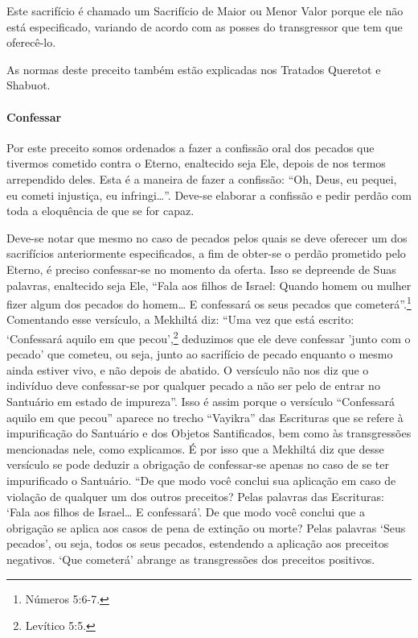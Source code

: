 Este sacrifício é chamado um Sacrifício de Maior ou Menor Valor porque
ele não está especificado, variando de acordo com as posses do
transgressor que tem que oferecê-lo.

As normas deste preceito também estão explicadas nos Tratados Queretot
e Shabuot.

\paragraph{Confessar}

Por este preceito somos ordenados a fazer a confissão oral dos pecados
que tivermos cometido contra o Eterno, enaltecido seja Ele, depois de
nos termos arrependido deles. Esta é a maneira de fazer a confissão:
``Oh, Deus, eu pequei, eu cometi injustiça, eu infringi\ldots{}''. Deve-se elaborar a
confissão e pedir perdão com toda a eloquência de que se for capaz.

Deve-se notar que mesmo no caso de pecados pelos quais se deve oferecer
um dos sacrifícios anteriormente especificados, a fim de obter-se o
perdão prometido pelo Eterno, é preciso confessar-se no momento da
oferta. Isso se depreende de Suas palavras, enaltecido seja Ele, ``Fala
aos filhos de Israel: Quando homem ou mulher fizer algum dos pecados do
homem\ldots{} E confessará os seus pecados que cometerá''.\footnote{Números 5:6-7.}
Comentando esse versículo, a Mekhiltá diz: ``Uma vez que está escrito:
`Confessará aquilo em que pecou',\footnote{Levítico 5:5.} deduzimos que ele deve
confessar 'junto com o pecado' que cometeu, ou seja, junto ao sacrifício
de pecado enquanto o mesmo ainda estiver vivo, e não depois de abatido.
O versículo não nos diz que o indivíduo deve confessar-se por qualquer
pecado a não ser pelo de entrar no Santuário em estado de impureza''.
Isso é assim porque o versículo ``Confessará aquilo em que pecou''
aparece no trecho ``Vayikra'' das Escrituras que se refere à
impurificação do Santuário e dos Objetos Santificados, bem como às
transgressões mencionadas nele, como explicamos. É por isso que a
Mekhiltá diz que desse versículo se pode deduzir a obrigação de
confessar-se apenas no caso de se ter impurificado o Santuário. ``De que
modo você conclui sua aplicação em caso de violação de qualquer um dos
outros preceitos? Pelas palavras das Escrituras: `Fala aos filhos de
Israel\ldots{} E confessará'. De que modo você conclui que a obrigação se
aplica aos casos de pena de extinção ou morte? Pelas palavras `Seus
pecados', ou seja, todos os seus pecados, estendendo a aplicação aos
preceitos negativos. `Que cometerá' abrange as transgressões dos
preceitos positivos.

